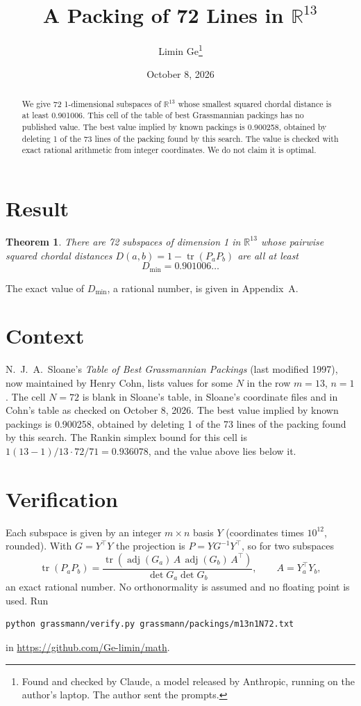 \documentclass[11pt,a4paper]{article}
\title{A Packing of 72 Lines in $\mathbb{R}^{13}$}
\author{Limin Ge\thanks{Found and checked by Claude, a model released by Anthropic, running on the author's laptop. The author sent the prompts.}}
\date{October 8, 2026}
\newtheorem*{theorem}{Theorem}
\begin{document}
\maketitle
\begin{abstract}
We give 72 1-dimensional subspaces of $\mathbb{R}^{13}$ whose smallest squared chordal distance is at least 0.901006. This cell of the table of best Grassmannian packings has no published value. The best value implied by known packings is 0.900258, obtained by deleting 1 of the 73 lines of the packing found by this search. The value is checked with exact rational arithmetic from integer coordinates. We do not claim it is optimal.
\end{abstract}

\section{Result}
\begin{theorem}
There are 72 subspaces of dimension 1 in $\mathbb{R}^{13}$ whose pairwise squared chordal distances $D(a,b) = 1 - \operatorname{tr}(P_aP_b)$ are all at least
\[ D_{\min} = 0.901006\ldots \]
\end{theorem}
The exact value of $D_{\min}$, a rational number, is given in Appendix~A.


\section{Context}
N.~J.~A.~Sloane's \emph{Table of Best Grassmannian Packings} (last modified 1997), now maintained by Henry Cohn, lists values for some $N$ in the row $m=13$, $n=1$. The cell $N=72$ is blank in Sloane's table, in Sloane's coordinate files and in Cohn's table as checked on October 8, 2026. The best value implied by known packings is 0.900258, obtained by deleting 1 of the 73 lines of the packing found by this search. The Rankin simplex bound for this cell is $1(13-1)/13\cdot 72/71 = 0.936078$, and the value above lies below it.


\section{Verification}
Each subspace is given by an integer $m\times n$ basis $Y$ (coordinates times $10^{12}$, rounded). With $G=Y^\top Y$ the projection is $P=YG^{-1}Y^\top$, so for two subspaces
\[ \operatorname{tr}(P_aP_b)=\frac{\operatorname{tr}(\operatorname{adj}(G_a)\,A\,\operatorname{adj}(G_b)\,A^\top)}{\det G_a\det G_b},\qquad A=Y_a^\top Y_b, \]
an exact rational number. No orthonormality is assumed and no floating point is used. Run
\begin{verbatim}
python grassmann/verify.py grassmann/packings/m13n1N72.txt
\end{verbatim}
in \url{https://github.com/Ge-limin/math}.
\end{document}
